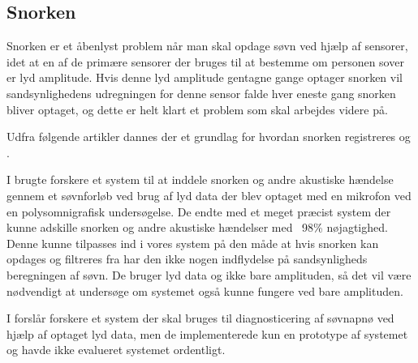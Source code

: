 \subsection{Snorken}
Snorken er et åbenlyst problem når man skal opdage søvn ved hjælp af sensorer, idet at en af de primære sensorer der bruges til at bestemme om personen sover er lyd amplitude.
Hvis denne lyd amplitude gentagne gange optager snorken vil sandsynlighedens udregningen for denne sensor falde hver eneste gang snorken bliver optaget, og dette er helt klart et problem som skal arbejdes videre på.

Udfra følgende artikler dannes der et grundlag for hvordan snorken registreres \citep{Dafna2013} og \citep{Calabrese20111101}.

I \citep{Dafna2013} brugte forskere et system til at inddele snorken og andre akustiske hændelse gennem et søvnforløb ved brug af lyd data der blev optaget med en mikrofon ved en polysomnigrafisk undersøgelse. 
De endte med et meget præcist system der kunne adskille snorken og andre akustiske hændelser med ~98\% nøjagtighed.
Denne kunne tilpasses ind i vores system på den måde at hvis snorken kan opdages og filtreres fra har den ikke nogen indflydelse på sandsynligheds beregningen af søvn. 
De bruger lyd data og ikke bare amplituden, så det vil være nødvendigt at undersøge om systemet også kunne fungere ved bare amplituden.

I \citep{Calabrese20111101} forslår forskere et system der skal bruges til diagnosticering af søvnapnø ved hjælp af optaget lyd data, men de implementerede kun en prototype af systemet og havde ikke evalueret systemet ordentligt. 